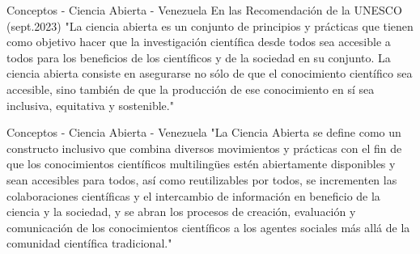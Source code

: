 \documentclass[11pt]{beamer}
\begin{document}

	\begin{frame}{Conceptos - Ciencia Abierta - Venezuela}
	\centering
En las Recomendación de la UNESCO (sept.2023)
"La ciencia abierta es un conjunto de principios y prácticas que tienen como objetivo hacer que la investigación científica desde todos sea accesible a todos para los beneficios de los científicos y de la sociedad en su conjunto. La ciencia abierta consiste en asegurarse no sólo de que el conocimiento científico sea accesible, sino también de que la producción de ese conocimiento en sí sea inclusiva, equitativa y sostenible."
	\end{frame}
	

	\begin{frame}{Conceptos - Ciencia Abierta - Venezuela}
	\centering
"La Ciencia Abierta se define como un constructo inclusivo que combina diversos movimientos y prácticas con el fin de que los conocimientos científicos multilingües estén abiertamente disponibles y sean accesibles para todos, así como reutilizables por todos, se incrementen las colaboraciones científicas y el intercambio de información en beneficio de la ciencia y la sociedad, y se abran los procesos de creación, evaluación y comunicación de los conocimientos científicos a los agentes sociales más allá de la comunidad científica tradicional."
	\end{frame}	
	
\end{document}
